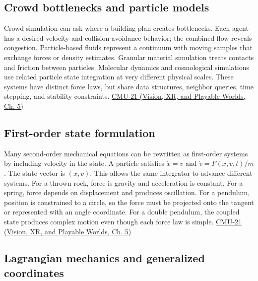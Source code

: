 \subsection{Crowd bottlenecks and particle models}\label{04-visual-computing-ii-ch029-crowd-bottlenecks-and-particle-models}

\hypertarget{04-visual-computing-ii-ch029-crowd-bottlenecks-and-particle-models}{}

Crowd simulation can ask where a building plan creates bottlenecks. Each agent has a desired velocity and collision-avoidance behavior; the combined flow reveals congestion. Particle-based fluids represent a continuum with moving samples that exchange forces or density estimates. Granular material simulation treats contacts and friction between particles. Molecular dynamics and cosmological simulations use related particle state integration at very different physical scales. These systems have distinct force laws, but share data structures, neighbor queries, time stepping, and stability constraints. \href{../07-Vision-XR-and-Playable-Worlds/main.pdf\#nameddest=04-visual-computing-ii-ch036-cmu-21---dynamics-and-time-integration}{CMU-21 (Vision, XR, and Playable Worlds, Ch. 5)}

\subsection{First-order state formulation}\label{04-visual-computing-ii-ch029-first-order-state-formulation}

\hypertarget{04-visual-computing-ii-ch029-first-order-state-formulation}{}

Many second-order mechanical equations can be rewritten as first-order systems by including velocity in the state. A particle satisfies \(\dot x=v\) and \(\dot v=F(x,v,t)/m\). The state vector is \((x,v)\). This allows the same integrator to advance different systems. For a thrown rock, force is gravity and acceleration is constant. For a spring, force depends on displacement and produces oscillation. For a pendulum, position is constrained to a circle, so the force must be projected onto the tangent or represented with an angle coordinate. For a double pendulum, the coupled state produces complex motion even though each force law is simple. \href{../07-Vision-XR-and-Playable-Worlds/main.pdf\#nameddest=04-visual-computing-ii-ch036-cmu-21---dynamics-and-time-integration}{CMU-21 (Vision, XR, and Playable Worlds, Ch. 5)}

\subsection{Lagrangian mechanics and generalized coordinates}\label{04-visual-computing-ii-ch029-lagrangian-mechanics-and-generalized-coordinates}


